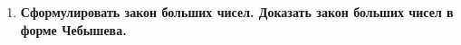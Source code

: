\documentclass[12pt]{report}
\begin{document}
\begin{enumerate}
\begin{figure}[!h]
	\end{figure}
	\begin{figure}[!h]
	\end{figure}
	\clearpage
	\item \textbf{Сформулировать закон больших чисел. Доказать закон больших чисел в форме Чебышева.}
	\begin{figure}[!h]
	\end{figure}
	\begin{figure}[!h]
	\end{figure}
	\begin{figure}[!h]

\end{figure}
\end{enumerate}
\end{document}
